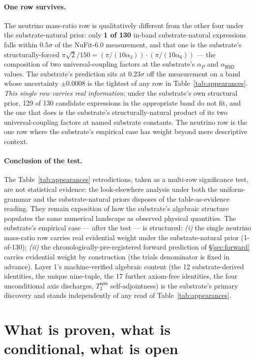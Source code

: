 \documentclass[11pt,a4paper]{amsart}
\theoremstyle{plain}
\theoremstyle{definition}
\begin{document}
\paragraph{One row survives.} The neutrino mass-ratio row is qualitatively different from the other four under the substrate-natural prior: only \textbf{1 of 130} in-band substrate-natural expressions falls within $0.5\sigma$ of the NuFit-6.0 measurement, and that one is the substrate's structurally-forced $\pi\sqrt{2}/150 = (\pi/(10\alpha_3)) \cdot (\pi/(10\alpha_6))$ --- the composition of two universal-coupling factors at the substrate's $\alpha_P$ and $\alpha_{\textsf{BSD}}$ values. The substrate's prediction sits at $0.23\sigma$ off the measurement on a band whose uncertainty $\pm 0.0008$ is the tightest of any row in Table~\ref{tab:appearances}. \emph{This single row carries real information}: under the substrate's own structural prior, 129 of 130 candidate expressions in the appropriate band do not fit, and the one that does is the substrate's structurally-natural product of its two universal-coupling factors at named substrate constants. The neutrino row is the one row where the substrate's empirical case has weight beyond mere descriptive context.

\paragraph{Conclusion of the test.} The Table~\ref{tab:appearances} retrodictions, taken as a multi-row significance test, are not statistical evidence: the look-elsewhere analysis under both the uniform-grammar and the substrate-natural priors disposes of the table-as-evidence reading. They remain exposition of how the substrate's algebraic structure populates the same numerical landscape as observed physical quantities. The substrate's empirical case --- after the test --- is structured: \emph{(i)} the single neutrino mass-ratio row carries real evidential weight under the substrate-natural prior (1-of-130); \emph{(ii)} the chronologically-pre-registered forward prediction of \S\ref{sec:forward} carries evidential weight by construction (the trials denominator is fixed in advance). Layer 1's machine-verified algebraic content (the 12 substrate-derived identities, the unique nine-tuple, the 17 further axiom-free identities, the four unconditional axis discharges, $T_3^{\textsf{sym}}$ self-adjointness) is the substrate's primary discovery and stands independently of any read of Table~\ref{tab:appearances}.

\section{What is proven, what is conditional, what is open}\label{sec:scope}
\end{document}
